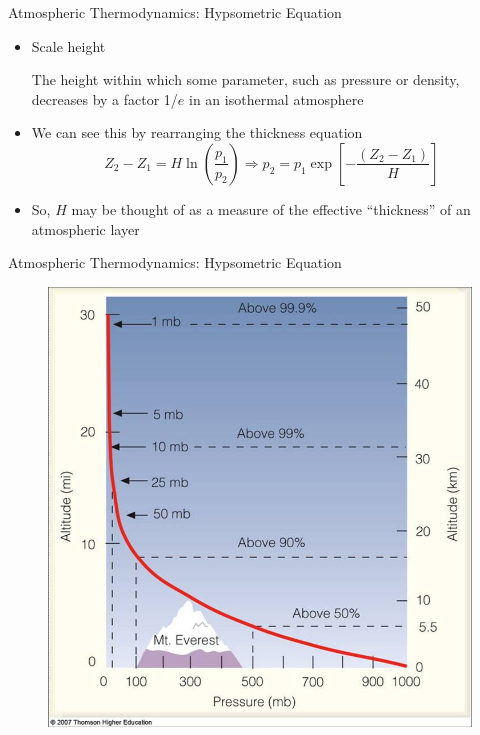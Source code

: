 \begin{frame}{Atmospheric Thermodynamics: Hypsometric Equation}
\begin{itemize}
	\item Scale height
	\begin{fancydefs}
		The height within which some parameter, such as pressure or density, decreases by a factor 1/$e$ in an isothermal atmosphere
	\end{fancydefs}
	\item We can see this by rearranging the thickness equation
	$$Z_2 - Z_1 = H\ln\left(\frac{p_1}{p_2}\right) \Rightarrow p_2 = p_1\exp\left[-\frac{(Z_2-Z_1)}{H}\right]$$
	\item So, $H$ may be thought of as a measure of the effective ``thickness'' of an atmospheric layer
\end{itemize}
\end{frame}


\begin{frame}{Atmospheric Thermodynamics: Hypsometric Equation}
\begin{figure}
	\includegraphics[height=0.88\textheight]{fig1}
\end{figure}
\end{frame}

